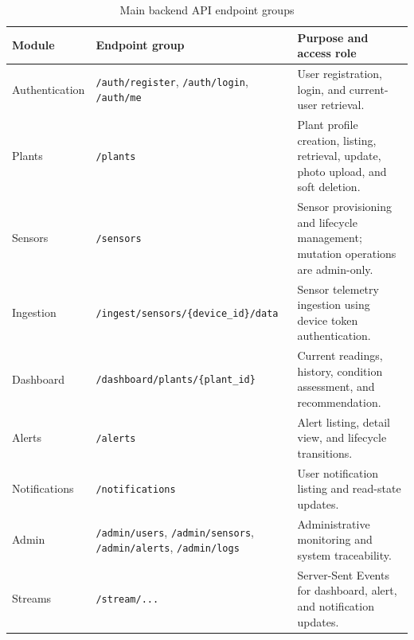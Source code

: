 \begin{table}[H]
\centering
\caption{Main backend API endpoint groups}
\label{tab:backend-api-endpoint-groups}
\begin{tabular}{p{}p{}p{}}
\hline
\textbf{Module} & \textbf{Endpoint group} & \textbf{Purpose and access role} \\
\hline
Authentication & \texttt{/auth/register}, \texttt{/auth/login}, \texttt{/auth/me} & User registration, login, and current-user retrieval. \\
Plants & \texttt{/plants} & Plant profile creation, listing, retrieval, update, photo upload, and soft deletion. \\
Sensors & \texttt{/sensors} & Sensor provisioning and lifecycle management; mutation operations are admin-only. \\
Ingestion & \texttt{/ingest/sensors/\{device\_id\}/data} & Sensor telemetry ingestion using device token authentication. \\
Dashboard & \texttt{/dashboard/plants/\{plant\_id\}} & Current readings, history, condition assessment, and recommendation. \\
Alerts & \texttt{/alerts} & Alert listing, detail view, and lifecycle transitions. \\
Notifications & \texttt{/notifications} & User notification listing and read-state updates. \\
Admin & \texttt{/admin/users}, \texttt{/admin/sensors}, \texttt{/admin/alerts}, \texttt{/admin/logs} & Administrative monitoring and system traceability. \\
Streams & \texttt{/stream/...} & Server-Sent Events for dashboard, alert, and notification updates. \\
\hline
\end{tabular}
\end{table}

